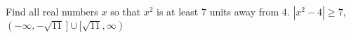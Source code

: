 {Find all real numbers $x$ so that $x^2$ is at least $7$ units away from $4$.}
{$|x^2 -4| \geq 7$, $(-\infty, -\sqrt{11} \,] \cup [\sqrt{11}, \infty)$}